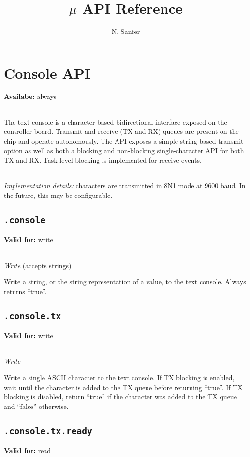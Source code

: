 \documentclass{article}
\title{$\mu$ API Reference}
\author{N. Santer}
\begin{document}
\maketitle

\tableofcontents

\clearpage

\section{Console API}
\textbf{Availabe:} always

~\\
The text console is a character-based bidirectional interface exposed on the controller board. Transmit and receive (TX and RX) queues are present on the chip and operate autonomously.
The API exposes a simple string-based transmit option as well as both a blocking and non-blocking single-character API for both TX and RX. Task-level blocking is implemented for receive events.

~\\
\textit{Implementation details:} characters are transmitted in 8N1 mode at 9600 baud. In the future, this may be configurable.

\subsection{\texttt{.console}}
\textbf{Valid for:} write

~\\
\textit{Write} (accepts strings)

Write a string, or the string representation of a value, to the text console. Always returns ``true''.

\subsection{\texttt{.console.tx}}
\textbf{Valid for:} write

~\\
\textit{Write}

Write a single ASCII character to the text console. If TX blocking is enabled, wait until the character is added to the TX queue before returning ``true''.
If TX blocking is disabled, return ``true'' if the character was added to the TX queue and ``false'' otherwise.

\subsection{\texttt{.console.tx.ready}}
\textbf{Valid for:} read
\end{document}
